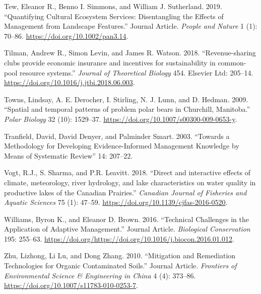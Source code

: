 \documentclass[fleqn,10pt]{wlpeerj} %
\begin{document}
\leavevmode\hypertarget{ref-Tew2019}{}%
Tew, Eleanor R., Benno I. Simmons, and William J. Sutherland. 2019.
``Quantifying Cultural Ecosystem Services: Disentangling the Effects of
Management from Landscape Features.'' Journal Article. \emph{People and
Nature} 1 (1): 70--86. \url{https://doi.org/10.1002/pan3.14}.

\leavevmode\hypertarget{ref-Tilman2018}{}%
Tilman, Andrew R., Simon Levin, and James R. Watson. 2018.
``Revenue-sharing clubs provide economic insurance and incentives for
sustainability in common-pool resource systems.'' \emph{Journal of
Theoretical Biology} 454. Elsevier Ltd: 205--14.
\url{https://doi.org/10.1016/j.jtbi.2018.06.003}.

\leavevmode\hypertarget{ref-Towns2009}{}%
Towns, Lindsay, A. E. Derocher, I. Stirling, N. J. Lunn, and D. Hedman.
2009. ``Spatial and temporal patterns of problem polar bears in
Churchill, Manitoba.'' \emph{Polar Biology} 32 (10): 1529--37.
\url{https://doi.org/10.1007/s00300-009-0653-y}.

\leavevmode\hypertarget{ref-Tranfield2003}{}%
Tranfield, David, David Denyer, and Palminder Smart. 2003. ``Towards a
Methodology for Developing Evidence-Informed Management Knowledge by
Means of Systematic Review'' 14: 207--22.

\leavevmode\hypertarget{ref-Vogt2018}{}%
Vogt, R.J., S. Sharma, and P.R. Leavitt. 2018. ``Direct and interactive
effects of climate, meteorology, river hydrology, and lake
characteristics on water quality in productive lakes of the Canadian
Prairies.'' \emph{Canadian Journal of Fisheries and Aquatic Sciences} 75
(1): 47--59. \url{https://doi.org/10.1139/cjfas-2016-0520}.

\leavevmode\hypertarget{ref-Williams2016}{}%
Williams, Byron K., and Eleanor D. Brown. 2016. ``Technical Challenges
in the Application of Adaptive Management.'' Journal Article.
\emph{Biological Conservation} 195: 255--63.
\url{https://doi.org/https://doi.org/10.1016/j.biocon.2016.01.012}.

\leavevmode\hypertarget{ref-Zhu2010}{}%
Zhu, Lizhong, Li Lu, and Dong Zhang. 2010. ``Mitigation and Remediation
Technologies for Organic Contaminated Soils.'' Journal Article.
\emph{Frontiers of Environmental Science \& Engineering in China} 4 (4):
373--86. \url{https://doi.org/10.1007/s11783-010-0253-7}.
\end{document}
